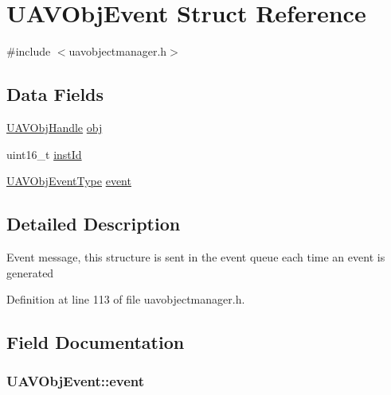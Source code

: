 \hypertarget{struct_u_a_v_obj_event}{\section{\-U\-A\-V\-Obj\-Event \-Struct \-Reference}
\label{struct_u_a_v_obj_event}
}


{\ttfamily \#include $<$uavobjectmanager.\-h$>$}

\subsection*{\-Data \-Fields}
\begin{DoxyCompactItemize}
\item 
\hyperlink{targets_2_u_a_v_objects_2inc_2uavobjectmanager_8h_a279053e22be53ce9f895043aaeb91e3b}{\-U\-A\-V\-Obj\-Handle} \hyperlink{struct_u_a_v_obj_event_a716555d74d08184a3807881d9ade9232}{obj}
\item 
uint16\-\_\-t \hyperlink{struct_u_a_v_obj_event_ad55867963dc4e2172799430c0b2323d8}{inst\-Id}
\item 
\hyperlink{targets_2_u_a_v_objects_2inc_2uavobjectmanager_8h_a34a55b89fda6526f21cfdcab529d0f99}{\-U\-A\-V\-Obj\-Event\-Type} \hyperlink{struct_u_a_v_obj_event_aa32f88659bb182b0178e388630c9a161}{event}
\end{DoxyCompactItemize}


\subsection{\-Detailed \-Description}
\-Event message, this structure is sent in the event queue each time an event is generated 

\-Definition at line 113 of file uavobjectmanager.\-h.



\subsection{\-Field \-Documentation}
\hypertarget{struct_u_a_v_obj_event_aa32f88659bb182b0178e388630c9a161}{
\subsubsection[{event}]{ {\bf \-U\-A\-V\-Obj\-Event\-::event}}}\label{struct_u_a_v_obj_event_aa32f88659bb182b0178e388630c9a161}


